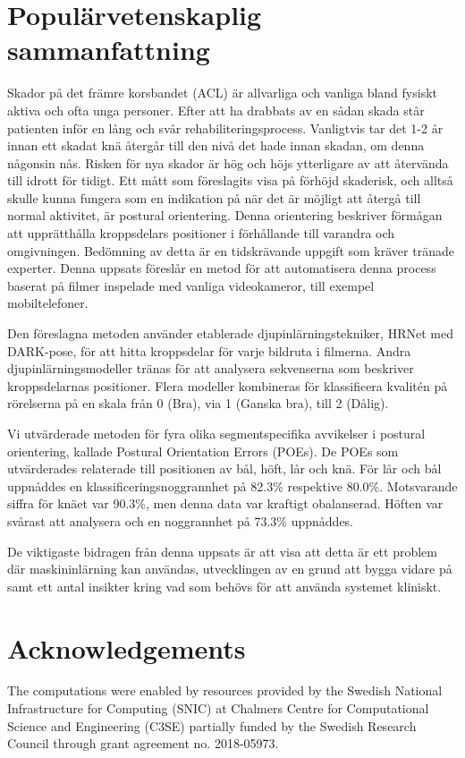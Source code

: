 \chapter*{Populärvetenskaplig sammanfattning}
Skador på det främre korsbandet (ACL) är allvarliga och vanliga bland fysiskt aktiva och ofta unga personer. Efter att ha drabbats av en sådan skada står patienten inför en lång och svår rehabiliteringsprocess. Vanligtvis tar det 1-2 år innan ett skadat knä återgår till den nivå det hade innan skadan, om denna någonsin nås. Risken för nya skador är hög och höjs ytterligare av att återvända till idrott för tidigt.
Ett mått som föreslagits visa på förhöjd skaderisk, och alltså skulle kunna fungera som en indikation på när det är möjligt att återgå till normal aktivitet, är postural orientering. Denna orientering beskriver förmågan att upprätthålla kroppsdelars positioner i förhållande till varandra och omgivningen. Bedömning av detta är en tidskrävande uppgift som kräver tränade experter. Denna uppsats föreslår en metod för att automatisera denna process baserat på filmer inspelade med vanliga videokameror, till exempel mobiltelefoner.

Den föreslagna metoden använder etablerade djupinlärnings\-tekniker, HRNet med DARK-pose, för att hitta kroppsdelar för varje bildruta i filmerna.
Andra djupinlärnings\-modeller tränas för att analysera sekvenserna som beskriver kroppsdelarnas positioner.
Flera modeller kombineras för klassificera kvalitén på rörelserna på en skala från 0 (Bra), via 1 (Ganska bra), till 2 (Dålig).

Vi utvärderade metoden för fyra olika segmentspecifika avvikelser i postural orientering, kallade Postural Orientation Errors (POEs). De POEs som utvärderades relaterade till positionen av bål, höft, lår och knä. För lår och bål uppnåddes en klassificerings\-noggrannhet på 82.3\% respektive 80.0\%. Motsvarande siffra för knäet var 90.3\%, men denna data var kraftigt obalanserad. Höften var svårast att analysera och en noggrannhet på 73.3\% uppnåddes.

De viktigaste bidragen från denna uppsats är att visa att detta är ett problem där maskininlärning kan användas, utvecklingen av en grund att bygga vidare på samt ett antal insikter kring vad som behövs för att använda systemet kliniskt.

\chapter*{Acknowledgements}
The computations were enabled by resources provided by the Swedish National Infrastructure for Computing (SNIC) at Chalmers Centre for Computational Science and Engineering (C3SE) partially funded by the Swedish Research Council through grant agreement no. 2018-05973.


